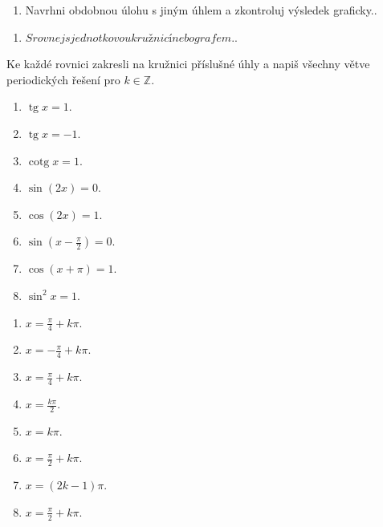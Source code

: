 \documentclass[11pt,a4paper]{article}
\begin{document}
\begin{zadaniReseniBox}[title={Rozšíření 1}]
\begin{enumerate}[label=\alph*)]
\item Navrhni obdobnou úlohu s jiným úhlem a zkontroluj výsledek graficky..
\end{enumerate}
\tcblower
\begin{enumerate}[label=\alph*)]
\item $Srovnej s jednotkovou kružnicí nebo grafem.$.
\end{enumerate}
\end{zadaniReseniBox}
Ke každé rovnici zakresli na kružnici příslušné úhly a napiš všechny větve periodických řešení pro $k\in\mathbb Z$.
\begin{zadaniReseniBox}[title={Domácí úkol}]
\begin{enumerate}[label=\alph*)]
\item $\operatorname{tg}x=1$.
\item $\operatorname{tg}x=-1$.
\item $\operatorname{cotg}x=1$.
\item $\sin(2x)=0$.
\item $\cos(2x)=1$.
\item $\sin(x-\frac{\pi}{2})=0$.
\item $\cos(x+\pi)=1$.
\item $\sin^2x=1$.
\end{enumerate}
\tcblower
\begin{enumerate}[label=\alph*)]
\item $x=\frac{\pi}{4}+k\pi$.
\item $x=-\frac{\pi}{4}+k\pi$.
\item $x=\frac{\pi}{4}+k\pi$.
\item $x=\frac{k\pi}{2}$.
\item $x=k\pi$.
\item $x=\frac{\pi}{2}+k\pi$.
\item $x=(2k-1)\pi$.
\item $x=\frac{\pi}{2}+k\pi$.
\end{enumerate}
\end{zadaniReseniBox}
\end{document}
